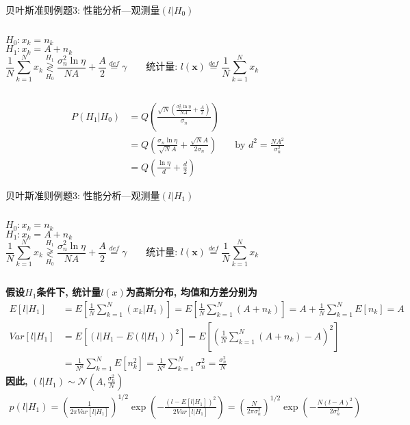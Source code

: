 \begin{frame}[shrink]{贝叶斯准则例题3: 性能分析---观测量$(l|H_0)$}
\begin{columns}
	$H_0:x_k=n_k$\\
	$H_1:x_k=A+n_k$
	\[
	\frac{1}{N}\sum\limits_{k=1}^{N}x_k\mathop{\gtrless}\limits_{H_0}^{H_1}\frac{\sigma_n^2\ln\eta}{NA}+\frac{A}{2}\mathop{=}\limits^{def}\gamma \qquad \textbf{统计量: }l(\bm{x})\mathop{=}\limits^{def}\frac{1}{N}\sum\limits_{k=1}^{N}x_k
	\]
\end{columns}
\begin{align*}
P(H_1|H_0)&=Q\left(\frac{\sqrt{N}\left(\frac{\sigma_n^2\ln\eta}{NA}+\frac{A}{2}\right)}{\sigma_n}\right)\\
&=Q\left(\frac{\sigma_n\ln\eta}{\sqrt{N}A}+\frac{\sqrt{N}A}{2\sigma_n}\right)&& \text{by }d^2=\frac{NA^2}{\sigma_n^2}\\
&=Q\left(\frac{\ln\eta}{d}+\frac{d}{2}\right)
\end{align*}
\end{frame}

\begin{frame}[shrink]{贝叶斯准则例题3: 性能分析---观测量$(l|H_1)$}
\begin{columns}
	$H_0:x_k=n_k$\\
	$H_1:x_k=A+n_k$
	\[
	\frac{1}{N}\sum\limits_{k=1}^{N}x_k\mathop{\gtrless}\limits_{H_0}^{H_1}\frac{\sigma_n^2\ln\eta}{NA}+\frac{A}{2}\mathop{=}\limits^{def}\gamma \qquad \textbf{统计量: }l(\bm{x})\mathop{=}\limits^{def}\frac{1}{N}\sum\limits_{k=1}^{N}x_k
	\]
\end{columns}
\textbf{假设$H_1$条件下, 统计量$l(x)$为高斯分布, 均值和方差分别为}
\begin{align*}
E[l|H_1]&=E\left[\frac{1}{N}\sum\limits_{k=1}^{N}(x_k|H_1)\right]=E\left[\frac{1}{N}\sum\limits_{k=1}^{N}(A+n_k)\right]=A+\frac{1}{N}\sum\limits_{k=1}^{N}E[n_k]=A\\
Var[l|H_1]&=E\left[(l|H_1-E(l|H_1))^2\right]=E\left[\left(\frac{1}{N}\sum\limits_{k=1}^{N}(A+n_k)-A\right)^2\right]\\
&=\frac{1}{N^2}\sum\limits_{k=1}^{N}E[n_k^2]=\frac{1}{N^2}\sum\limits_{k=1}^{N}\sigma_n^2=\frac{\sigma_n^2}{N}
\end{align*}
\textbf{因此, }$(l|H_1)\sim\mathcal{N}(A,\frac{\sigma_n^2}{N})$
\begin{align*}
p(l|H_1)=\left(\frac{1}{2\pi Var[l|H_1]}\right)^{1/2}\exp\left(-\frac{(l-E[l|H_1])^2}{2 Var[l|H_1]}\right)=\left(\frac{N}{2\pi\sigma_n^2}\right)^{1/2}\exp\left(-\frac{N(l-A)^2}{2\sigma_n^2}\right)
\end{align*}
\end{frame}

